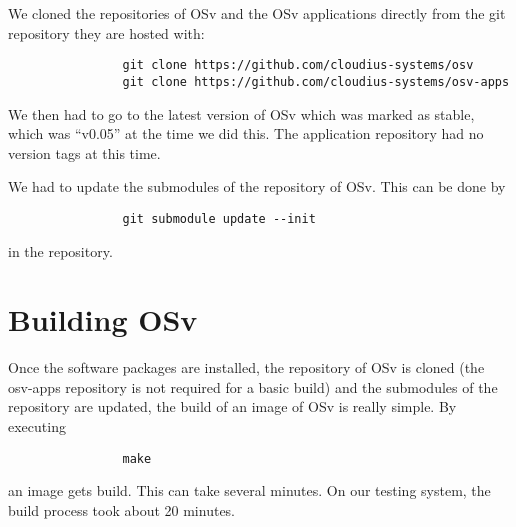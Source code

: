         We cloned the repositories of OSv and the OSv applications directly from
        the git repository they are hosted with:

            \begin{lstlisting}
                git clone https://github.com/cloudius-systems/osv
                git clone https://github.com/cloudius-systems/osv-apps
            \end{lstlisting}

        We then had to go to the latest version of OSv which was marked as
        stable, which was ``v0.05'' at the time we did this. The application
        repository had no version tags at this time.

        We had to update the submodules of the repository of OSv. This can be
        done by

            \begin{lstlisting}
                git submodule update --init
            \end{lstlisting}

        in the repository.

    \section{Building OSv}

        Once the software packages are installed, the repository of OSv is
        cloned (the osv-apps repository is not required for a basic build) and
        the submodules of the repository are updated, the build of an image of
        OSv is really simple. By executing

            \begin{lstlisting}
                make
            \end{lstlisting}

        an image gets build. This can take several minutes. On our testing
        system, the build process took about 20 minutes.

